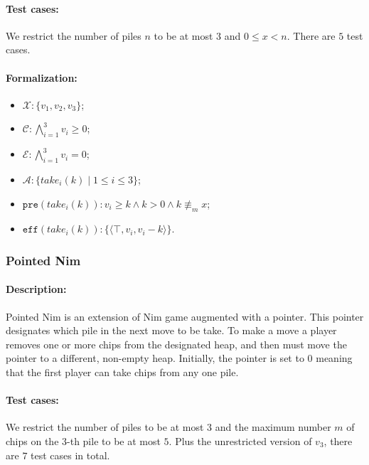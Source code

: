 \documentclass[review]{elsarticle}
\newcommand{\set}[1]{\{ #1 \}}
\newcommand{\tuple}[1]{\langle {#1} \rangle}
\newcommand{\true}{\top}
\newcommand{\statevar}{\mathcal{X}}
\newcommand{\act}{\mathcal{A}}
\newcommand{\constraint}{\mathcal{C}}
\newcommand{\estate}{\mathcal{E}}
\newcommand{\pre}{\mathtt{pre}}
\newcommand{\eff}{\mathtt{eff}}
\newcommand{\nmodulo}{\not \equiv}
\begin{document}
\paragraph{Test cases:}
We restrict the number of piles $n$ to be at most $3$ and $0\le x <n$.
There are $5$ test cases.
\paragraph{Formalization:}
\begin{itemize}
	\item $\statevar: \set{v_1, v_2, v_3}$;
	\item $\constraint: \bigwedge_{i=1}^{3} v_i \ge 0$;
	\item $\estate: \bigwedge_{i=1}^{3} v_i = 0$;
	\item $\act:\set{take_i(k){\mid}1 \le i\le 3}$;
	\item $\pre(take_i(k)) : v_i \ge k \wedge k > 0 \wedge k \nmodulo_m x$;
	\item $\eff(take_i(k)) : \set{\tuple{\true,v_i,v_i -k}}$.
\end{itemize}

\subsubsection{Pointed Nim \protect\cite{AlbN2004}}

\paragraph{Description:}
Pointed Nim is an extension of Nim game augmented with a pointer. %
This pointer designates which pile in the next move to be take. 
To make a move a player removes one or more chips from the designated heap, and then must move the pointer to a different, non-empty heap. 
Initially, the pointer is set to $0$ meaning that the first player can take chips from any one pile.
\paragraph{Test cases:}
We restrict the number of piles to be at most $3$ and the maximum number $m$ of chips on the $3$-th pile to be at most $5$. 
Plus the unrestricted version of $v_3$, there are $7$ test cases in total.
\end{document}
